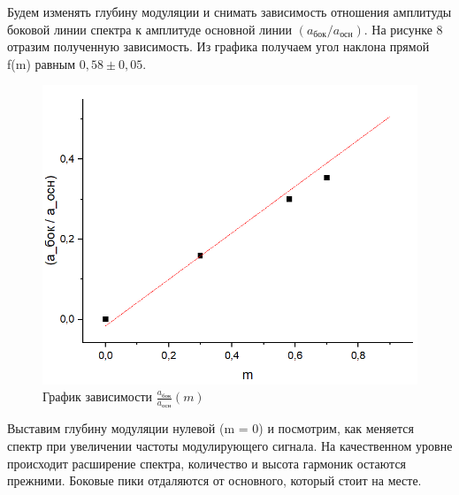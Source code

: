 \documentclass[a4paper, fontsize = 14pt]{article}
\begin{document}
Будем изменять глубину модуляции и снимать зависимость отношения амплитуды боковой линии спектра к амплитуде основной линии $(a_{бок}/a_{осн})$. На рисунке 8 отразим полученную зависимость. Из графика получаем угол наклона прямой f(m) равным $0,58 \pm 0,05$.

\begin{figure}[hbt]
	\centering
	\includegraphics[scale=0.6]{lab361ris11.png}
	\caption{График зависимости $\frac{a_{бок}}{a_{осн}}(m)$}
\end{figure}

Выставим глубину модуляции нулевой (m = 0) и посмотрим, как меняется спектр при увеличении частоты модулирующего сигнала. На качественном уровне происходит расширение спектра, количество и высота гармоник остаются прежними. Боковые пики отдаляются от основного, который стоит на месте.
\end{document}
